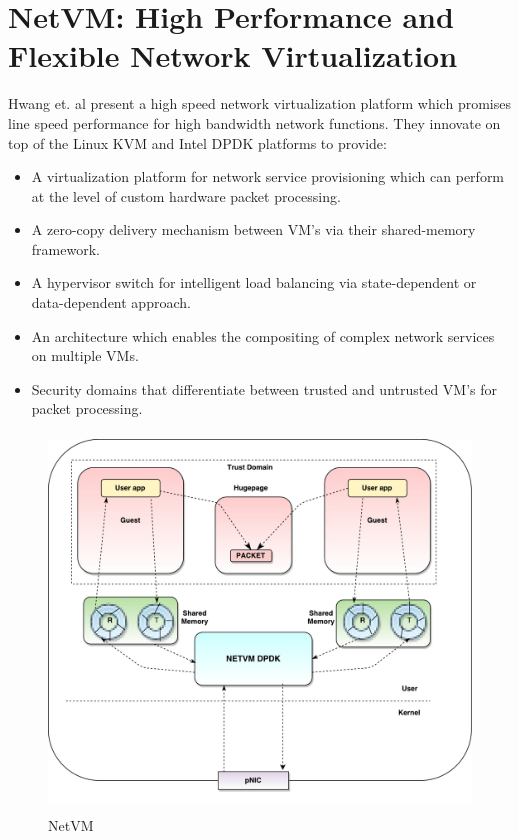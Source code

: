 \section{NetVM: High Performance and Flexible Network Virtualization}
Hwang et. al \cite{hwang2015netvm} present a high speed network virtualization platform which promises line speed performance for high bandwidth network functions. They innovate on top of the Linux KVM and Intel DPDK platforms to provide:
\begin{itemize}
	\item A virtualization platform for network service provisioning which can perform at the level of custom hardware packet processing.
	\item A zero-copy delivery mechanism between VM's via their shared-memory framework.
	\item A hypervisor switch for intelligent load balancing via state-dependent or data-dependent approach.
	\item An architecture which enables the compositing of complex network services on multiple VMs.
	\item Security domains that differentiate between trusted and untrusted VM's for packet processing.
\end{itemize}

 \begin{figure}[H]
	\centering
	\caption{NetVM}	
	\includegraphics[height=10cm]{netvm01.pdf}	
\end{figure}


